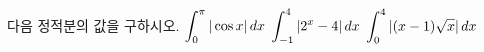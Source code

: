 다음 정적분의 값을 구하시오.
 $\displaystyle\int_{0}^{\pi}|\cos x|\mkern3mu dx$
 $\displaystyle\int_{-1}^{4}|2^x-4|\mkern3mu dx$
 $\displaystyle\int_{0}^{4}|(x-1)\sqrt{x}|\mkern3mu dx$
